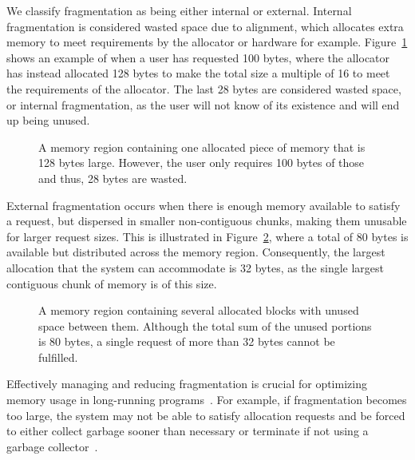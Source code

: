 
We classify fragmentation as being either internal or external. Internal fragmentation is considered wasted space due to alignment, which allocates extra memory to meet requirements by the allocator or hardware for example. Figure~\ref{fig:internal_fragmentation} shows an example of when a user has requested 100 bytes, where the allocator has instead allocated 128 bytes to make the total size a multiple of 16 to meet the requirements of the allocator. The last 28 bytes are considered wasted space, or internal fragmentation, as the user will not know of its existence and will end up being unused.

\begin{figure}[H]
    \centering
    \vspace*{0.2cm}
    
    \vspace*{0.2cm}
    \caption{A memory region containing one allocated piece of memory that is 128 bytes large. However, the user only requires 100 bytes of those and thus, 28 bytes are wasted.}
    \label{fig:internal_fragmentation}
\end{figure}

External fragmentation occurs when there is enough memory available to satisfy a request, but dispersed in smaller non-contiguous chunks, making them unusable for larger request sizes. This is illustrated in Figure~\ref{fig:external_fragmentation}, where a total of 80 bytes is available but distributed across the memory region. Consequently, the largest allocation that the system can accommodate is 32 bytes, as the single largest contiguous chunk of memory is of this size.

\begin{figure}[H]
    \centering
    \vspace*{0.2cm}
    \hspace*{1.2cm}
    
    \vspace*{0.2cm}
    \caption{A memory region containing several allocated blocks with unused space between them. Although the total sum of the unused portions is 80 bytes, a single request of more than 32 bytes cannot be fulfilled.}
    \label{fig:external_fragmentation}
\end{figure}

Effectively managing and reducing fragmentation is crucial for optimizing memory usage in long-running programs~\cite{gchandbook}. For example, if fragmentation becomes too large, the system may not be able to satisfy allocation requests and be forced to either collect garbage sooner than necessary or terminate if not using a garbage collector~\cite{gchandbook}.

